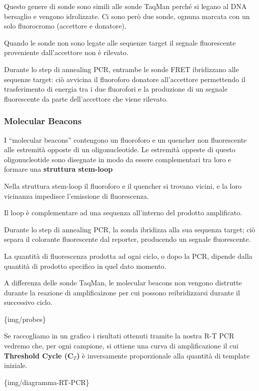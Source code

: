 \documentclass[11pt]{book}
\begin{document}
Questo genere di sonde sono simili alle sonde TaqMan perché si legano al
DNA bersaglio e vengono idrolizzate. Ci sono però due sonde, ognuna
marcata con un solo fluorocromo (accettore e donatore).

Quando le sonde non sono legate alle sequenze target il segnale
fluorescente proveniente dall'accettore non è rilevato.

Durante lo step di annealing PCR, entrambe le sonde FRET ibridizzano
alle sequenze target: ciò avvicina il fluoroforo donatore all'accettore
permettendo il trasferimento di energia tra i due fluorofori e la
produzione di un segnale fluorescente da parte dell'accettore che viene
rilevato.

\subsubsection{Molecular Beacons}\label{molecular-beacons}

I ``molecular beacons'' contengono un fluoroforo e un quencher non
fluorescente alle estremità opposte di un oligonucleotide. Le estremità
oppeste di questo oligonucleotide sono disegnate in modo da essere
complementari tra loro e formare una \textbf{struttura stem-loop}

Nella struttura stem-loop il fluoroforo e il quencher si trovano vicini,
e la loro vicinanza impedisce l'emissione di fluorescenza.

Il loop è complementare ad una sequenza all'interno del prodotto
amplificato.

Durante lo step di annealing PCR, la sonda ibridizza alla sua sequenza
target; ciò separa il colorante fluorescente dal reporter, producendo un
segnale fluorescente.

La quantità di fluorescenza prodotta ad ogni ciclo, o dopo la PCR,
dipende dalla quantità di prodotto specifico in quel dato momento.

A differenza delle sonde TaqMan, le molecular beacons non vengono
distrutte durante la reazione di amplificaizone per cui possono
reibridizzarsi durante il successivo ciclo.

\{img/probes\}

Se raccogliamo in un grafico i risultati ottenuti tramite la nostra R-T
PCR vedremo che, per ogni campione, si ottiene una curva di
amplificazione il cui \textbf{Threshold Cycle (C\(_T\))} è inversamente
proporzionale alla quantità di template iniziale.

\{img/diagramma-RT-PCR\}
\end{document}
